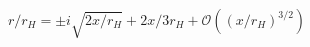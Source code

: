 \begin{equation}
r/r_H = \pm i \sqrt{2x/r_H} + 2x/3r_H + {\mathcal O}\left((x/r_H)^{3/2}\right)
\end{equation}


